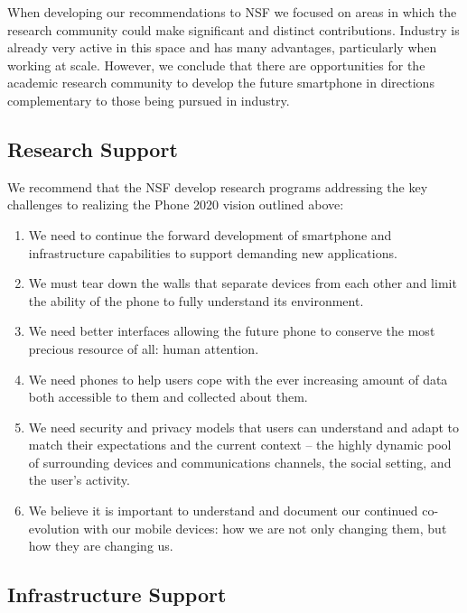 When developing our recommendations to NSF we focused on areas in which the
research community could make significant and distinct contributions.
Industry is already very active in this space and has many advantages,
particularly when working at scale. However, we conclude that there are
opportunities for the academic research community to develop the future
smartphone in directions complementary to those being pursued in industry.

\subsection{Research Support}

We recommend that the NSF develop research programs addressing the key
challenges to realizing the Phone 2020 vision outlined above:

\begin{enumerate}

\item We need to continue the forward development of smartphone and
infrastructure capabilities to support demanding new applications.

\item We must tear down the walls that separate devices from each other and
limit the ability of the phone to fully understand its environment.

\item We need better interfaces allowing the future phone to conserve the
most precious resource of all: human attention.

\item We need phones to help users cope with the ever increasing amount of
data both accessible to them and collected about them.

\item We need security and privacy models that users can understand and adapt
to match their expectations and the current context – the highly dynamic pool
of surrounding devices and communications channels, the social setting, and
the user’s activity. 

\item We believe it is important to understand and document our continued
co-evolution with our mobile devices: how we are not only changing them, but
how they are changing us.

\end{enumerate}

\subsection{Infrastructure Support}

